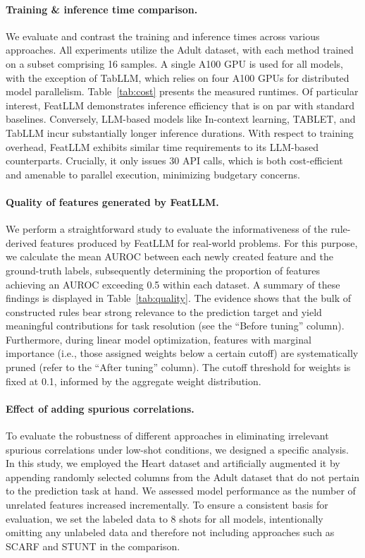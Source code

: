 \vspace*{-0.12in}
\paragraph{Training \& inference time comparison.} We evaluate and contrast the training and inference times across various approaches. All experiments utilize the Adult dataset, with each method trained on a subset comprising 16 samples. A single A100 GPU is used for all models, with the exception of TabLLM, which relies on four A100 GPUs for distributed model parallelism. Table~\ref{tab:cost} presents the measured runtimes. Of particular interest, \textsf{FeatLLM} demonstrates inference efficiency that is on par with standard baselines. Conversely, LLM-based models like In-context learning, TABLET, and TabLLM incur substantially longer inference durations. With respect to training overhead, \textsf{FeatLLM} exhibits similar time requirements to its LLM-based counterparts. Crucially, it only issues 30 API calls, which is both cost-efficient and amenable to parallel execution, minimizing budgetary concerns.

\vspace*{-0.12in}
\paragraph{Quality of features generated by \textsf{FeatLLM}.}
We perform a straightforward study to evaluate the informativeness of the rule-derived features produced by \textsf{FeatLLM} for real-world problems. For this purpose, we calculate the mean AUROC between each newly created feature and the ground-truth labels, subsequently determining the proportion of features achieving an AUROC exceeding 0.5 within each dataset. 
A summary of these findings is displayed in Table~\ref{tab:quality}. The evidence shows that the bulk of constructed rules bear strong relevance to the prediction target and yield meaningful contributions for task resolution (see the “Before tuning” column). Furthermore, during linear model optimization, features with marginal importance (i.e., those assigned weights below a certain cutoff) are systematically pruned (refer to the “After tuning” column). The cutoff threshold for weights is fixed at 0.1, informed by the aggregate weight distribution.

\vspace*{-0.12in}
\paragraph{Effect of adding spurious correlations.} To evaluate the robustness of different approaches in eliminating irrelevant spurious correlations under low-shot conditions, we designed a specific analysis. In this study, we employed the Heart dataset and artificially augmented it by appending randomly selected columns from the Adult dataset that do not pertain to the prediction task at hand. We assessed model performance as the number of unrelated features increased incrementally. To ensure a consistent basis for evaluation, we set the labeled data to 8 shots for all models, intentionally omitting any unlabeled data and therefore not including approaches such as SCARF and STUNT in the comparison.

